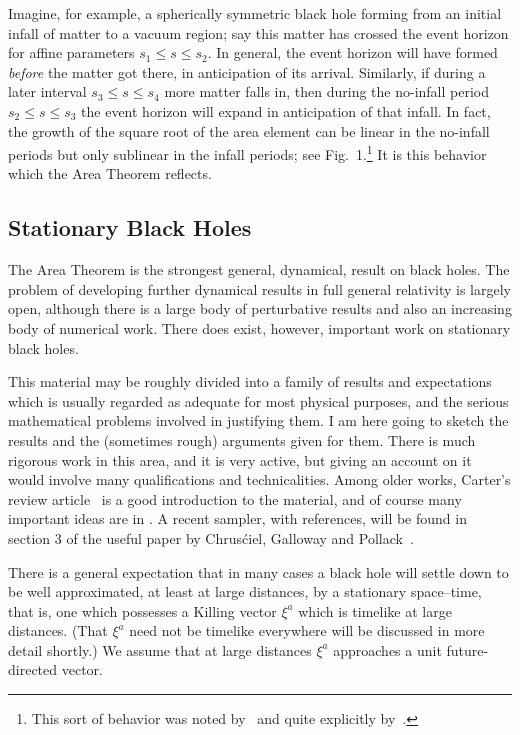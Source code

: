 \documentclass[
%
draft    %
,numberedheadings 
,bibliocites
  ]
  {aipproc}
\begin{document}
Imagine, for example, a spherically symmetric black hole forming from an initial infall of matter to a vacuum region; say this matter has crossed the event horizon for affine parameters $s_1\leq s\leq s_2$.  In general, the event horizon will have formed {\em before} the matter got there, in anticipation of its arrival.  Similarly, if during a later interval $s_3\leq s\leq s_4$ more matter falls in, then during the no-infall period $s_2\leq s\leq s_3$ the event horizon will expand in anticipation of that infall.  In fact, the growth of the square root of the area element can be linear in the no-infall periods but only sublinear in the infall periods; see Fig.~1.\footnote{This sort of behavior was noted by~\citet{Carter:1979} and quite explicitly by~\citet{Booth:2005qc}.}  It is this behavior which the Area Theorem reflects.



\subsection{Stationary Black Holes}

The Area Theorem is the strongest general, dynamical, result on black holes.  
The problem of developing further dynamical results in full general relativity is largely open, although there is a large body of perturbative results and also an increasing body of numerical work.
There does exist, however, important work on stationary black holes.

This material may be roughly divided into a family of results and expectations which is usually regarded as adequate for most physical purposes, and the serious mathematical problems involved in justifying them.  
I am here going to sketch the results and the (sometimes rough) arguments given for them.  There is much rigorous work in this area, and it is very active, but giving an account on it
would involve many qualifications and technicalities.
Among older works,
Carter's review article~\citep{Carter:1979} is a good introduction to the material, and of course many important ideas are in \citet{Hawking:1973uf}.  
A recent sampler, with references, will be found in section 3 of the useful paper by Chrus\'ciel, Galloway and Pollack~\cite{Chrusciel:2010fn}.


There is a general expectation that in many cases a black hole will settle down to be well approximated, at least at large distances, by a stationary space--time, that is, one which possesses a Killing vector $\xi ^a$ which is timelike at large distances.   
(That $\xi ^a$ need not be timelike everywhere will be discussed in more detail shortly.)
We assume that at large distances $\xi ^a$ approaches a unit future-directed vector.
\end{document}
